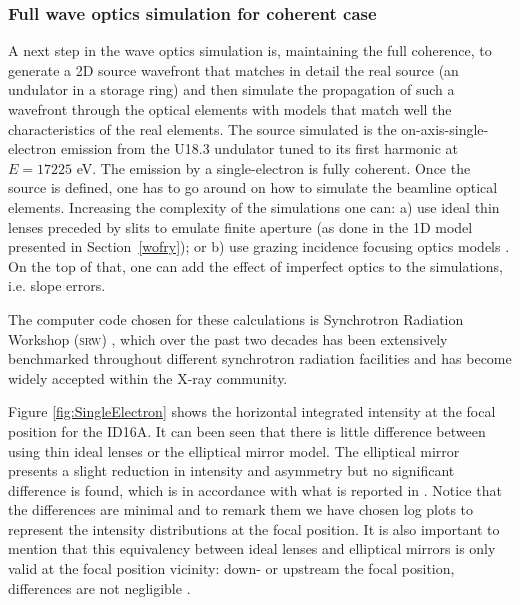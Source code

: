 \documentclass{iucr}              %
\begin{document}
\subsubsection{Full wave optics simulation for coherent case}
\label{srw_se}
% 
A next step in the wave optics simulation is, maintaining the full coherence, to generate a 2D source wavefront that matches in detail the real source (an undulator in a storage ring) and then simulate the propagation of such a wavefront through the optical elements with models that match well the characteristics of the real elements. The source simulated is the on-axis-single-electron emission from the U18.3 undulator tuned to its first harmonic at $E=17225$ eV. The emission by a single-electron is fully coherent. Once the source is defined, one has to go around on how to simulate the beamline optical elements. Increasing the complexity of the simulations one can: a) use ideal thin lenses preceded by slits to emulate finite aperture (as done in the 1D model presented in Section~\ref{wofry}); or b) use grazing incidence focusing optics models \cite{Canestrari2014}. On the top of that, one can add the effect of imperfect optics to the simulations, i.e. slope errors. 

The computer code chosen for these calculations is Synchrotron Radiation Workshop (\textsc{srw}) \cite{codeSRW}, which over the past two decades has been extensively benchmarked throughout different synchrotron radiation facilities and has become widely accepted within the X-ray community.

Figure \ref{fig:SingleElectron} shows the horizontal integrated intensity at the focal position for the ID16A. It can been seen that there is little difference between using thin ideal lenses or the elliptical mirror model. The elliptical mirror presents a slight reduction in intensity and asymmetry but no significant difference is found, which is in accordance with what is reported in \cite{Canestrari2014}. Notice that the differences are minimal and to remark them we have chosen log plots to represent the intensity distributions at the focal position. It is also important to mention that this equivalency between ideal lenses and elliptical mirrors is only valid at the focal position vicinity: down- or upstream the focal position, differences are not negligible \cite{Canestrari2014}. 
\end{document}
